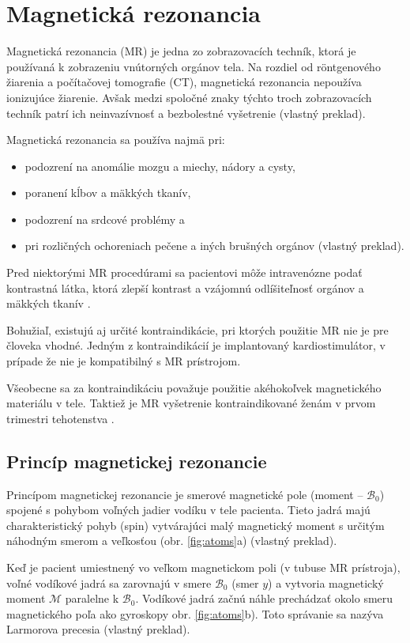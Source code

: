 \chapter {Magnetická rezonancia}
Magnetická rezonancia (MR) je jedna zo zobrazovacích techník, ktorá je používaná k zobrazeniu vnútorných orgánov tela.
Na rozdiel od röntgenového žiarenia a počítačovej tomografie (CT), magnetická rezonancia nepoužíva ionizujúce žiarenie. Avšak medzi spoločné znaky týchto troch zobrazovacích techník patrí ich neinvazívnosť a bezbolestné vyšetrenie \cite{basic_principles_of_mri} (vlastný preklad).

Magnetická rezonancia sa používa najmä pri:
\begin {itemize}
\item {podozrení na anomálie mozgu a miechy, nádory a cysty,}
\item {poranení kĺbov a mäkkých tkanív,}
\item {podozrení na srdcové problémy a}
\item {pri rozličných ochoreniach pečene a iných brušných orgánov \cite{mr_usage} (vlastný preklad).}
\end {itemize}

Pred niektorými MR procedúrami sa pacientovi môže intravenózne podať kontrastná látka, ktorá zlepší kontrast a vzájomnú odlíšiteľnosť orgánov a mäkkých tkanív \cite{contrast_agents}.

Bohužiaľ, existujú aj určité kontraindikácie, pri ktorých použitie MR nie je pre človeka vhodné.
Jedným z kontraindikácií je implantovaný kardiostimulátor, v prípade že nie je kompatibilný s MR prístrojom.
\clearpage

Všeobecne sa za kontraindikáciu považuje použitie akéhokoľvek magnetického materiálu v tele. Taktiež je MR vyšetrenie kontraindikované ženám v prvom trimestri tehotenstva \cite{mr_contraindications}.

\section {Princíp magnetickej rezonancie}
Princípom magnetickej rezonancie je smerové magnetické pole (moment -- $\mathcal{B}_{0}$) spojené s pohybom voľných jadier vodíku v tele pacienta. Tieto jadrá majú charakteristický pohyb (spin) vytvárajúci malý magnetický moment s určitým náhodným smerom a veľkosťou (obr. \ref{fig:atoms}a) \cite{basic_principles_of_mri} (vlastný preklad).

Keď je pacient umiestnený vo veľkom magnetickom poli (v tubuse MR prístroja), voľné vodíkové jadrá sa zarovnajú v smere $\mathcal{B}_{0}$ (smer $y$) a vytvoria magnetický moment $\mathcal{M}$ paralelne k $\mathcal{B}_{0}$. Vodíkové jadrá začnú náhle prechádzať okolo smeru magnetického poľa ako gyroskopy obr. \ref{fig:atoms}b). Toto správanie sa nazýva Larmorova precesia \cite{basic_principles_of_mri} (vlastný preklad).

